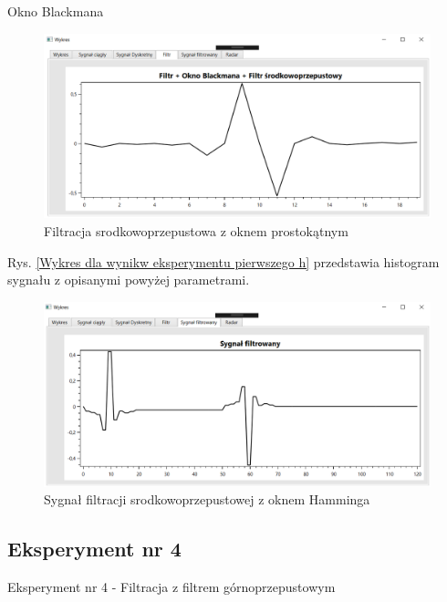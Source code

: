 \documentclass[12pt]{article}
\begin{document}
\newpage
Okno Blackmana
\begin{figure}[h!]
 \centering
 \includegraphics[width=12.3cm]{prostFSOB.PNG}
 \vspace{-0.3cm}
 \caption{Filtracja srodkowoprzepustowa z oknem prostokątnym}
 \label{Wykres dla wyników eksperymentu drugiego}
\end{figure}
\newpage
Rys. \ref{Wykres dla wynikw eksperymentu pierwszego h} przedstawia histogram sygnału z opisanymi powyżej parametrami. 
\begin{figure}[h!]
 \centering
 \includegraphics[width=12.3cm]{prostSFSB.PNG}
 \vspace{-0.3cm}
 \caption{Sygnał filtracji srodkowoprzepustowej z oknem Hamminga}
 \label{Histogram dla wyników eksperymentu drugiego}
\end{figure}



\subsection{Eksperyment nr 4}

Eksperyment nr 4  - Filtracja z filtrem górnoprzepustowym
\end{document}
